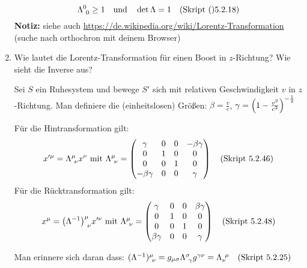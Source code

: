 \begin{enumerate}
    \begin{equation*}
      \Lambda^{0}_{\ 0} \ge 1 
      \quad \text{und}\quad
      \det \Lambda = 1 \quad\text{(Skript ()}5.2.18)
    \end{equation*}
    \textbf{Notiz:} siehe auch 
    \url{https://de.wikipedia.org/wiki/Lorentz-Transformation} (suche 
    nach orthochron mit deinem Browser)

  \item Wie lautet die Lorentz-Transformation für einen Boost in 
    $z$-Richtung? Wie sieht die Inverse aus?
    
    Sei $S$ ein Ruhesystem und bewege $S'$ sich mit relativen 
    Geschwindigkeit $v$ in $z$-Richtung. Man definiere die (einheitslosen)
    Größen:
    $\beta = \frac{v}{c}$, $\gamma=\qty(1-\frac{v^2}{c^2})^{-\frac{1}{2}}$
    
    Für die Hintransformation gilt:
    \begin{equation*}
      x'^\mu = \Lambda^\mu_{\ \nu} x^\nu 
      \text{ mit } 
      \Lambda^\mu_{\ \nu}=
      \begin{pmatrix}
        \gamma       & 0 & 0 & -\beta\gamma\\
        0            & 1 & 0 & 0           \\
        0            & 0 & 1 & 0           \\
        -\beta\gamma & 0 & 0 & \gamma      \\
      \end{pmatrix}
      \quad\text{(Skript 5.2.46)}
    \end{equation*}
    Für die Rücktransformation gilt:
    \begin{equation*}
      x^\mu = \qty(\Lambda^{-1})^\mu_{\ \nu} x'^\nu 
      \text{ mit } 
      \Lambda^\mu_{\ \nu}=
      \begin{pmatrix}
        \gamma       & 0 & 0 & \beta\gamma\\
        0            & 1 & 0 & 0           \\
        0            & 0 & 1 & 0           \\
        \beta\gamma  & 0 & 0 & \gamma      \\
      \end{pmatrix}
      \quad\text{(Skript 5.2.48)}
    \end{equation*}

    Man erinnere sich daran dass:
      $(\Lambda^{-1})^\mu_{\ \nu}
      =g_{\mu\sigma}\Lambda^{\sigma}_{\ \gamma}g^{\gamma\nu}
      =\Lambda_{\nu}^{\ \mu}
      \quad\text{(Skript 5.2.25)}$


\end{enumerate}
